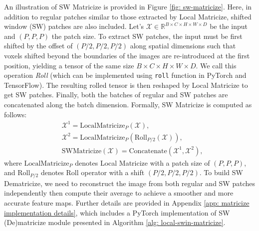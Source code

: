 \documentclass[a4,12pt]{article}
\begin{document}
	An illustration of SW Matricize is provided in Figure \ref{fig: sw-matricize}. Here, in addition to regular patches similar to those extracted by Local Matricize, shifted window (SW) patches are also included. Let's $ \bm{\mathcal{X}} \in \mathbb{R}^{B \times C \times H \times W \times D} $ be the input and $ (P, P, P) $ the patch size. To extract SW patches, the input must be first shifted by the offset of $ (P/2, P/2, P/2) $ along spatial dimensions such that voxels shifted beyond the boundaries of the images are re-introduced at the first position, yielding a tensor of the same size $ B \times C \times H \times W \times D $. We call this operation \textit{Roll} (which can be implemented using \texttt{roll} function in PyTorch and TensorFlow). The resulting rolled tensor is then reshaped by Local Matricize to get SW patches. Finally, both the batches of regular and SW patches are concatenated along the batch dimension. Formally, SW Matricize is computed as follows:
	\begin{align}
		\label{eq: sw-matricize}
		& \bm{\mathcal{X}}^1 = \text{LocalMatricize}_{P}(\bm{\mathcal{X}}), \nonumber \\
		& \bm{\mathcal{X}}^2 = \text{LocalMatricize}_{P}(\text{Roll}_{P/2}(\bm{\mathcal{X}})), \nonumber \\
		& \text{SWMatricize}(\bm{\mathcal{X}}) = \text{Concatenate}(\bm{\mathcal{X}}^1, \bm{\mathcal{X}}^2),
	\end{align}
	where $ \text{LocalMatricize}_{P} $ denotes Local Matricize with a patch size of $ (P, P, P) $, and $ \text{Roll}_{P/2} $ denotes Roll operator with a shift $ (P/2, P/2, P/2) $. To build SW Dematricize, we need to reconstruct the image from both regular and SW patches independently then compute their average to achieve a smoother and more accurate feature maps. 
	Further details are provided in Appendix \ref{app: matricize implementation details}, which includes a PyTorch implementation of SW (De)matricize module presented in Algorithm \ref{alg: local-swin-matricize}.
	
\end{document}
